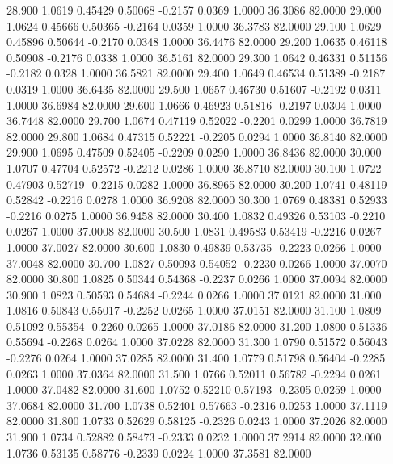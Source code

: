   28.900   1.0619   0.45429   0.50068  -0.2157   0.0369   1.0000  36.3086  82.0000
  29.000   1.0624   0.45666   0.50365  -0.2164   0.0359   1.0000  36.3783  82.0000
  29.100   1.0629   0.45896   0.50644  -0.2170   0.0348   1.0000  36.4476  82.0000
  29.200   1.0635   0.46118   0.50908  -0.2176   0.0338   1.0000  36.5161  82.0000
  29.300   1.0642   0.46331   0.51156  -0.2182   0.0328   1.0000  36.5821  82.0000
  29.400   1.0649   0.46534   0.51389  -0.2187   0.0319   1.0000  36.6435  82.0000
  29.500   1.0657   0.46730   0.51607  -0.2192   0.0311   1.0000  36.6984  82.0000
  29.600   1.0666   0.46923   0.51816  -0.2197   0.0304   1.0000  36.7448  82.0000
  29.700   1.0674   0.47119   0.52022  -0.2201   0.0299   1.0000  36.7819  82.0000
  29.800   1.0684   0.47315   0.52221  -0.2205   0.0294   1.0000  36.8140  82.0000
  29.900   1.0695   0.47509   0.52405  -0.2209   0.0290   1.0000  36.8436  82.0000
  30.000   1.0707   0.47704   0.52572  -0.2212   0.0286   1.0000  36.8710  82.0000
  30.100   1.0722   0.47903   0.52719  -0.2215   0.0282   1.0000  36.8965  82.0000
  30.200   1.0741   0.48119   0.52842  -0.2216   0.0278   1.0000  36.9208  82.0000
  30.300   1.0769   0.48381   0.52933  -0.2216   0.0275   1.0000  36.9458  82.0000
  30.400   1.0832   0.49326   0.53103  -0.2210   0.0267   1.0000  37.0008  82.0000
  30.500   1.0831   0.49583   0.53419  -0.2216   0.0267   1.0000  37.0027  82.0000
  30.600   1.0830   0.49839   0.53735  -0.2223   0.0266   1.0000  37.0048  82.0000
  30.700   1.0827   0.50093   0.54052  -0.2230   0.0266   1.0000  37.0070  82.0000
  30.800   1.0825   0.50344   0.54368  -0.2237   0.0266   1.0000  37.0094  82.0000
  30.900   1.0823   0.50593   0.54684  -0.2244   0.0266   1.0000  37.0121  82.0000
  31.000   1.0816   0.50843   0.55017  -0.2252   0.0265   1.0000  37.0151  82.0000
  31.100   1.0809   0.51092   0.55354  -0.2260   0.0265   1.0000  37.0186  82.0000
  31.200   1.0800   0.51336   0.55694  -0.2268   0.0264   1.0000  37.0228  82.0000
  31.300   1.0790   0.51572   0.56043  -0.2276   0.0264   1.0000  37.0285  82.0000
  31.400   1.0779   0.51798   0.56404  -0.2285   0.0263   1.0000  37.0364  82.0000
  31.500   1.0766   0.52011   0.56782  -0.2294   0.0261   1.0000  37.0482  82.0000
  31.600   1.0752   0.52210   0.57193  -0.2305   0.0259   1.0000  37.0684  82.0000
  31.700   1.0738   0.52401   0.57663  -0.2316   0.0253   1.0000  37.1119  82.0000
  31.800   1.0733   0.52629   0.58125  -0.2326   0.0243   1.0000  37.2026  82.0000
  31.900   1.0734   0.52882   0.58473  -0.2333   0.0232   1.0000  37.2914  82.0000
  32.000   1.0736   0.53135   0.58776  -0.2339   0.0224   1.0000  37.3581  82.0000
